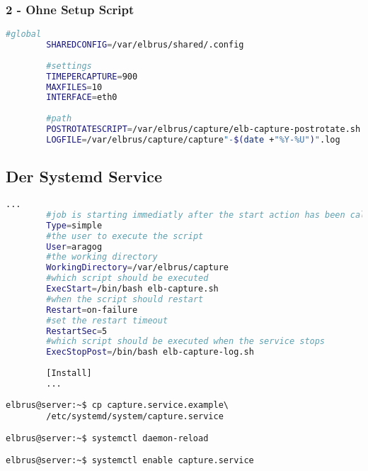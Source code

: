 \documentclass{article}
\begin{document}
	\subsubsection{2 - Ohne Setup Script}
	\lstset{style=files}
	\begin{lstlisting}[caption={Anhand von '.env.example' eigene '.env' Datei anlegen}, language=bash]
		#global
		SHAREDCONFIG=/var/elbrus/shared/.config
		
		#settings
		TIMEPERCAPTURE=900
		MAXFILES=10
		INTERFACE=eth0
		
		#path
		POSTROTATESCRIPT=/var/elbrus/capture/elb-capture-postrotate.sh
		LOGFILE=/var/elbrus/capture/capture"-$(date +"%Y-%U")".log
	\end{lstlisting}

	\newpage
	\subsection[systemd service]{Der Systemd Service}
	\begin{lstlisting}[caption={capture.service.example - Die Variable 'WorkingDirectory', Die Variable 'User' sowie die Variable 'ExecStopPost' anpassen.},language=bash ,keywords={WorkingDirectory, User, ExecStopPost}, keywordstyle=\color{red}, firstnumber=3]
		...
		#job is starting immediatly after the start action has been called
		Type=simple
		#the user to execute the script
		User=aragog
		#the working directory
		WorkingDirectory=/var/elbrus/capture
		#which script should be executed
		ExecStart=/bin/bash elb-capture.sh
		#when the script should restart
		Restart=on-failure
		#set the restart timeout
		RestartSec=5
		#which script should be executed when the service stops
		ExecStopPost=/bin/bash elb-capture-log.sh
		
		[Install]
		...
	\end{lstlisting}
	
	\lstset{style=commands}
	\begin{lstlisting}[caption={Kopieren des Serviceprogrammes}]
		elbrus@server:~$ cp capture.service.example\
		/etc/systemd/system/capture.service
	\end{lstlisting}

	\begin{lstlisting}[caption={Neuladen des 'systemctl' Deamons}]
		elbrus@server:~$ systemctl daemon-reload
	\end{lstlisting}
	
	\begin{lstlisting}[caption={Aktivieren des Serviceprogrammes}]
		elbrus@server:~$ systemctl enable capture.service
	\end{lstlisting}
\end{document}
